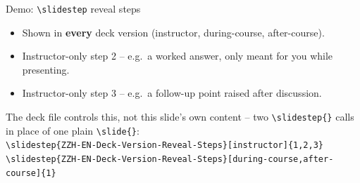 
\begin{standardframe}{Demo: \texttt{\textbackslash slidestep} reveal steps}
	\begin{itemize}
		\item Shown in \textbf{every} deck version (instructor, during-course, after-course).
		\item<2-> Instructor-only step 2 -- e.g.\ a worked answer, only meant for you while presenting.
		\item<3-> Instructor-only step 3 -- e.g.\ a follow-up point raised after discussion.
	\end{itemize}
	\bigskip
	\small The deck file controls this, not this slide's own content -- two
	\texttt{\textbackslash slidestep\{\}} calls in place of one plain
	\texttt{\textbackslash slide\{\}}:\\[0.3em]
	\texttt{\textbackslash slidestep\{ZZH-EN-Deck-Version-Reveal-Steps\}[instructor]\{1,2,3\}}\\
	\texttt{\textbackslash slidestep\{ZZH-EN-Deck-Version-Reveal-Steps\}[during-course,after-course]\{1\}}
\end{standardframe}
